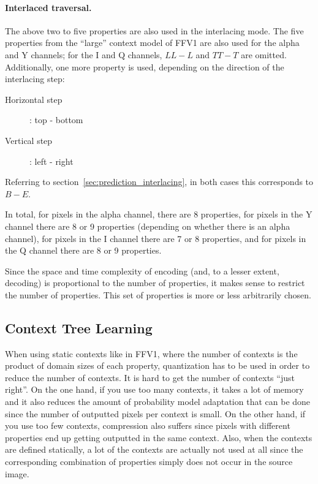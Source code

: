 \documentclass[a4paper,USenglish]{lipics}
\begin{document}
\paragraph{Interlaced traversal.}
The above two to five properties are also used in the interlacing mode. The five properties from the
``large'' context model of FFV1 are also used for the alpha and Y channels; for the I and Q channels,
$LL-L$ and $TT-T$ are omitted. Additionally, one more property is used, depending on the direction of the interlacing step:
\begin{description}
\item[Horizontal step]: top - bottom
\item[Vertical step]: left - right
\end{description}
Referring to section~\ref{sec:prediction_interlacing}, in both cases this corresponds to $B-E$.

In total, for pixels in the alpha channel, there are 8 properties, for pixels in the Y channel there are 8 or 9 properties
(depending on whether there is an alpha channel), for pixels in the I channel there are 7 or 8 properties, and for pixels
in the Q channel there are 8 or 9 properties.

Since the space and time complexity of encoding (and, to a lesser extent, decoding) is proportional to the number of properties,
it makes sense to restrict the number of properties. This set of properties is more or less arbitrarily chosen.



\subsection{Context Tree Learning}
\label{sec:context_tree}

When using static contexts like in FFV1, where the number of contexts is the product of
domain sizes of each property, quantization has to be used in order to reduce
the number of contexts. It is hard to get the number of contexts ``just right''.
On the one hand, if you use too many contexts, it takes a lot of memory and it also reduces
the amount of probability model adaptation that can be done since the number of outputted
pixels per context is small. On the other hand, if you use too few contexts, compression also
suffers since pixels with different properties end up getting outputted in the same context.
Also, when the contexts are defined statically,
a lot of the contexts are actually not used at all since the corresponding
combination of properties simply does not occur in the source image.
\end{document}
